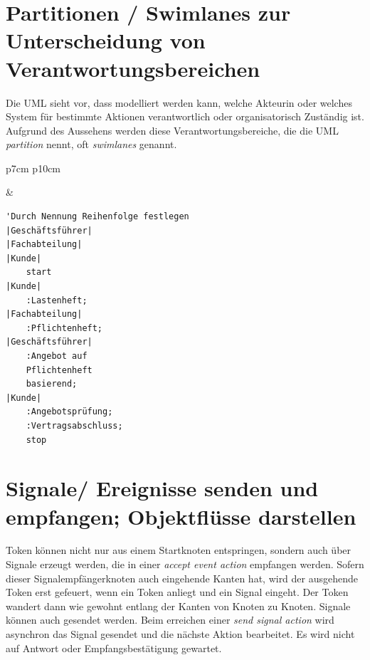 \documentclass[10pt]{scrartcl}
\begin{document}
\section{Partitionen / Swimlanes zur Unterscheidung von Verantwortungsbereichen}
Die UML sieht vor, dass modelliert werden kann, welche Akteurin oder welches System für bestimmte Aktionen verantwortlich oder organisatorisch Zuständig ist. Aufgrund des Aussehens werden diese Verantwortungsbereiche, die die UML \textit{partition} nennt, oft \textit{swimlanes} genannt.

\begin{tabular}[b]{p{7cm} p{10cm}}
	
	&
	
	\begin{lstlisting}[style=plantuml]
'Durch Nennung Reihenfolge festlegen
|Geschäftsführer|
|Fachabteilung|
|Kunde|
	start
|Kunde|
	:Lastenheft;
|Fachabteilung|
	:Pflichtenheft;
|Geschäftsführer|
	:Angebot auf 
	Pflichtenheft 
	basierend;
|Kunde|
	:Angebotsprüfung;
	:Vertragsabschluss;
	stop
\end{lstlisting}
\end{tabular}

\section{Signale/ Ereignisse senden und empfangen; Objektflüsse darstellen}

Token können nicht nur aus einem Startknoten entspringen, sondern auch über Signale erzeugt werden, die in einer \textit{accept event action} empfangen werden. Sofern dieser Signalempfängerknoten auch eingehende Kanten hat, wird der ausgehende Token erst gefeuert, wenn ein Token anliegt und ein Signal eingeht. Der Token wandert dann wie gewohnt entlang der Kanten von Knoten zu Knoten. 
Signale können auch gesendet werden. Beim erreichen einer \textit{send signal action} wird asynchron das Signal gesendet und die nächste Aktion bearbeitet. Es wird nicht auf Antwort oder Empfangsbestätigung gewartet.
\end{document}
